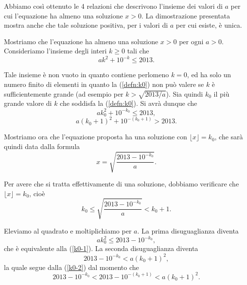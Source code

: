 {Abbiamo così ottenuto le 4 relazioni che descrivono l'insieme dei valori di $a$ per cui l'equazione ha almeno una soluzione $x>0$. La dimostrazione presentata mostra anche che tale soluzione positiva, per i valori di $a$ per cui esiste, è unica.

\DomandaB

Mostriamo che l'equazione ha almeno una soluzione $x>0$ per ogni $a>0$. Consideriamo l'insieme degli interi $k\geq 0$ tali che
\begin{equation}
	ak^{2}+10^{-k}\leq 2013.
	\label{defn:k0}
\end{equation}

Tale insieme è non vuoto in quanto contiene perlomeno $k=0$, ed ha solo un numero finito di elementi in quanto la (\ref{defn:k0}) non può valere se $k$ è sufficientemente grande (ad esempio per $k>\sqrt{2013/a}$). Sia quindi $k_{0}$ il più grande valore di $k$ che soddisfa la (\ref{defn:k0}). Si avrà dunque che
\begin{equation}
	ak_{0}^{2}+10^{-k_{0}}\leq 2013,
	\label{k0-1}
\end{equation}
\begin{equation}
	a(k_{0}+1)^{2}+10^{-(k_{0}+1)}> 2013.
	\label{k0-2}
\end{equation}

Mostriamo ora che l'equazione proposta ha una soluzione con $\lfloor x\rfloor=k_{0}$, che sarà quindi data dalla formula
$$x=\sqrt{\frac{2013-10^{-k_{0}}}{a}}.$$

Per avere che si tratta effettivamente di una soluzione, dobbiamo verificare che $\lfloor x\rfloor=k_{0}$, cioè
$$k_{0}\leq\sqrt{\frac{2013-10^{-k_{0}}}{a}}< k_{0}+1.$$

Eleviamo al quadrato e moltiplichiamo per $a$. La prima disuguaglianza diventa
$$ak_{0}^{2}\leq 2013-10^{-k_{0}},$$
che è equivalente alla (\ref{k0-1}). La seconda disuguaglianza diventa
$$2013-10^{-k_{0}}<a(k_{0}+1)^{2},$$
la quale segue dalla (\ref{k0-2}) dal momento che
$$2013-10^{-k_{0}}<2013-10^{-(k_{0}+1)}<a(k_{0}+1)^{2}.$$
}


